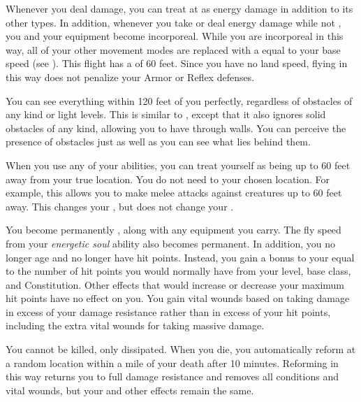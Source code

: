              Whenever you deal damage, you can treat at as energy damage in addition to its other types.
            In addition, whenever you take or deal energy damage while not , you and your equipment  become incorporeal.
            While you are incorporeal in this way, all of your other movement modes are replaced with a  equal to your base speed (see ).
            This flight has a  of 60 feet.
            Since you have no land speed, flying in this way does not penalize your Armor or Reflex defenses.

             You can see everything within 120 feet of you perfectly, regardless of obstacles of any kind or light levels.
            This is similar to , except that it also ignores solid obstacles of any kind, allowing you to have  through walls.
            You can perceive the presence of obstacles just as well as you can see what lies behind them.

             When you use any of your abilities, you can treat yourself as being up to 60 feet away from your true location.
            You do not need  to your chosen location.
            For example, this allows you to make melee attacks against creatures up to 60 feet away.
            This changes your , but does not change your .

             You become permanently , along with any equipment you carry.
            The fly speed from your \textit{energetic soul} ability also becomes permanent.
            In addition, you no longer age and no longer have hit points.
            Instead, you gain a bonus to your  equal to the number of hit points you would normally have from your level, base class, and Constitution.
            Other effects that would increase or decrease your maximum hit points have no effect on you.
            You gain vital wounds based on taking damage in excess of your damage resistance rather than in excess of your hit points, including the extra vital wounds for taking massive damage.

             You cannot be killed, only dissipated.
            When you die, you automatically reform at a random location within a mile of your death after 10 minutes.
            Reforming in this way returns you to full damage resistance and removes all conditions and vital wounds, but your  and other effects remain the same.

